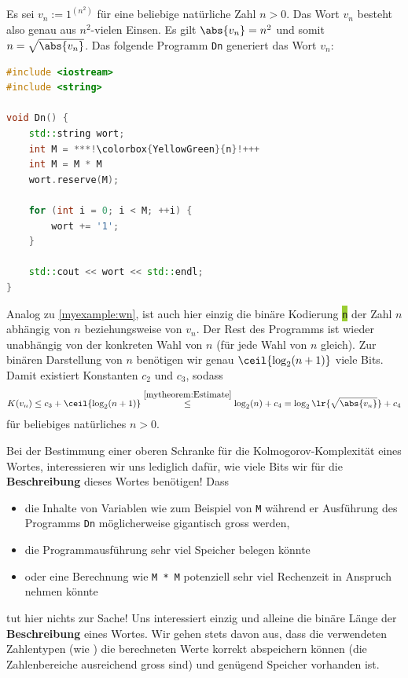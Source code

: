 \begin{myexample}\label{myexample:vn}
Es sei $v_n := 1^{(n^2)}$ für eine beliebige natürliche Zahl $n > 0$. Das Wort $v_n$ besteht also genau aus $n^2$-vielen Einsen. Es gilt $\abs{v_n} = n^2$ und somit $n = \sqrt{\abs{v_n}}$. Das folgende Programm \texttt{Dn} generiert das Wort $v_n$:
\begin{lstlisting}[language=C++,escapechar=!] 
#include <iostream>
#include <string>

void Dn() {
    std::string wort;
    int M = ***!\colorbox{YellowGreen}{n}!+++
    int M = M * M
    wort.reserve(M);

    for (int i = 0; i < M; ++i) {
        wort += '1';
    }

    std::cout << wort << std::endl;
}
    \end{lstlisting}
Analog zu \cref{myexample:wn}, ist auch hier einzig die binäre Kodierung \colorbox{YellowGreen}{\texttt{n}} der Zahl $n$ abhängig von $n$ beziehungsweise von $v_n$. Der Rest des Programms ist wieder unabhängig von der konkreten Wahl von $n$ (für jede Wahl von $n$ gleich). Zur binären Darstellung von $n$ benötigen wir genau $\ceil{\log_2(n+1)}$ viele Bits. Damit existiert Konstanten $c_2$ und $c_3$, sodass
\begin{align*}
	K(v_n) \leq c_3 + \ceil{\log_2(n+1)} \stackrel{\cref{mytheorem:Estimate}}{\leq} \log_2(n) + c_4 = \log_2\lr{\sqrt{\abs{v_n}}} + c_4
\end{align*}
für beliebiges natürliches $n>0$.

Bei der Bestimmung einer oberen Schranke für die Kolmogorov-Komplexität eines Wortes, interessieren wir uns lediglich dafür, wie viele Bits wir für die \textbf{Beschreibung} dieses Wortes benötigen!
Dass
\begin{itemize}
	\item die Inhalte von Variablen wie zum Beispiel von \texttt{M} während er Ausführung des Programms \texttt{Dn} möglicherweise gigantisch gross werden,
	\item die Programmausführung sehr viel Speicher belegen könnte
	\item oder eine Berechnung wie \texttt{M * M} potenziell sehr viel Rechenzeit in Anspruch nehmen könnte
\end{itemize}
tut hier nichts zur Sache! Uns interessiert einzig und alleine die binäre Länge der \textbf{Beschreibung} eines Wortes. Wir gehen stets davon aus, dass die verwendeten Zahlentypen (wie ) die berechneten Werte korrekt abspeichern können (die Zahlenbereiche ausreichend gross sind) und genügend Speicher vorhanden ist.
\end{myexample}

